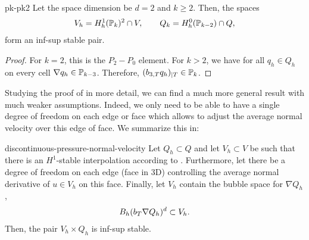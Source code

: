 \begin{Corollary}{pk-pk2}
  Let the space dimension be $d=2$ and $k\ge 2$. Then, the spaces
  \begin{gather}
    V_h = H^1_h(\P_k)^2 \cap V,
    \qquad
    Q_k = H^0_h(\P_{k-2}) \cap Q,
  \end{gather}
  form an inf-sup stable pair.
\end{Corollary}

\begin{proof}
  For $k=2$, this is the $P_2-P_0$ element. For $k>2$, we have for all
  $q_h\in Q_h$ on every cell $\nabla q_h\in \P_{k-3}$. Therefore,
  $(b_{3,\cell} q_h)_{|\cell} \in \P_k$.
\end{proof}

\begin{intro}
  Studying the proof of  in more
  detail, we can find a much more general result with much weaker
  assumptions. Indeed, we only need to be able to have a single degree
  of freedom on each edge or face which allows to adjust the average
  normal velocity over this edge of face. We summarize this in:
\end{intro}

\begin{Theorem}{discontinuous-pressure-normal-velocity}
  Let $Q_h\subset Q$ and let $V_h \subset V$ be such that there is an
  $H^1$-stable interpolation according to
  . Furthermore, let
  there be a degree of freedom on each edge (face in 3D) controlling
  the average normal derivative of $u\in V_h$ on this face. Finally,
  let $V_h$ contain the bubble space for $\nabla Q_h$,
  \begin{gather*}
    B_h(b_\cell \nabla Q_h)^d \subset V_h.
  \end{gather*}
  Then, the pair $V_h\times Q_h$ is inf-sup stable.
\end{Theorem}

